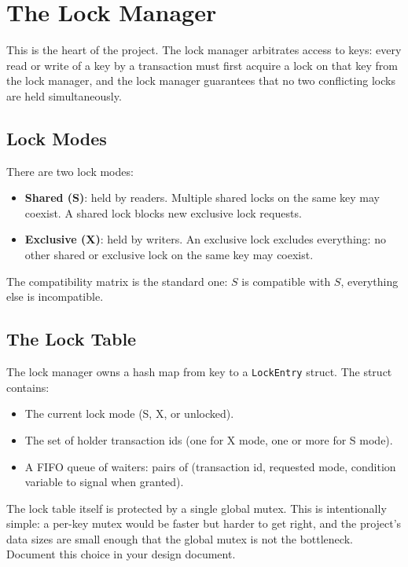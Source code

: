 \documentclass[11pt,a4paper]{article}
\begin{document}
\section{The Lock Manager}

This is the heart of the project. The lock manager arbitrates access to keys: every read or write of a key by a transaction must first acquire a lock on that key from the lock manager, and the lock manager guarantees that no two conflicting locks are held simultaneously.

\subsection{Lock Modes}
There are two lock modes:

\begin{itemize}
\item \textbf{Shared (S)}: held by readers. Multiple shared locks on the same key may coexist. A shared lock blocks new exclusive lock requests.
\item \textbf{Exclusive (X)}: held by writers. An exclusive lock excludes everything: no other shared or exclusive lock on the same key may coexist.
\end{itemize}

The compatibility matrix is the standard one: $S$ is compatible with $S$, everything else is incompatible.

\subsection{The Lock Table}
The lock manager owns a hash map from key to a \texttt{LockEntry} struct. The struct contains:

\begin{itemize}
\item The current lock mode (S, X, or unlocked).
\item The set of holder transaction ids (one for X mode, one or more for S mode).
\item A FIFO queue of waiters: pairs of (transaction id, requested mode, condition variable to signal when granted).
\end{itemize}

The lock table itself is protected by a single global mutex. This is intentionally simple: a per-key mutex would be faster but harder to get right, and the project's data sizes are small enough that the global mutex is not the bottleneck. Document this choice in your design document.
\end{document}
